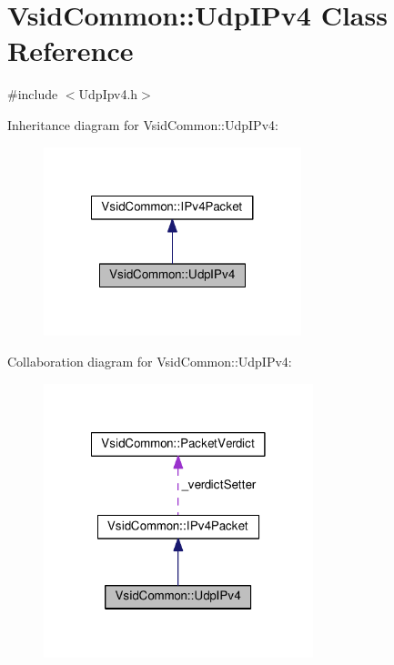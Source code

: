 \hypertarget{class_vsid_common_1_1_udp_i_pv4}{\section{Vsid\-Common\-:\-:Udp\-I\-Pv4 Class Reference}
\label{class_vsid_common_1_1_udp_i_pv4}
}


{\ttfamily \#include $<$Udp\-Ipv4.\-h$>$}



Inheritance diagram for Vsid\-Common\-:\-:Udp\-I\-Pv4\-:
\nopagebreak
\begin{figure}[H]
\begin{center}
\leavevmode
\includegraphics[width=212pt]{class_vsid_common_1_1_udp_i_pv4__inherit__graph}
\end{center}
\end{figure}


Collaboration diagram for Vsid\-Common\-:\-:Udp\-I\-Pv4\-:
\nopagebreak
\begin{figure}[H]
\begin{center}
\leavevmode
\includegraphics[width=222pt]{class_vsid_common_1_1_udp_i_pv4__coll__graph}
\end{center}
\end{figure}
